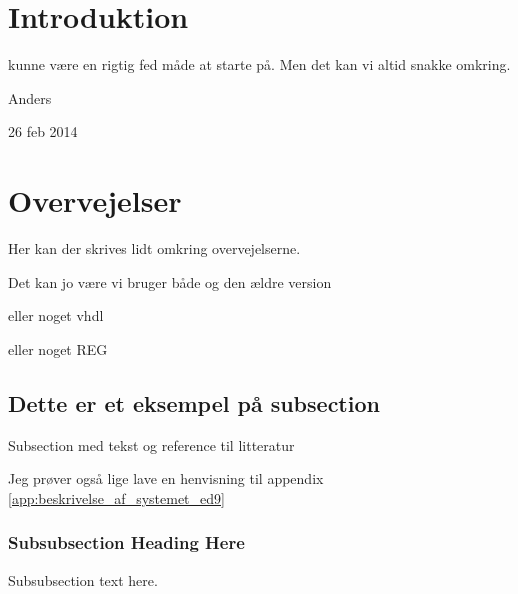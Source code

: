 \section{Introduktion}
\label{sec:introduction}

 kunne være en rigtig fed måde at starte på. Men det kan vi altid snakke omkring.

\hfill Anders
 
\hfill 26 feb 2014


\section{Overvejelser}
Her kan der skrives lidt omkring overvejelserne. 


Det kan jo være vi bruger både\citep{operating_systems_concepts_ed9}
og den ældre version \citep[Side. 223]{operating_systems_concepts_ed8}


eller noget vhdl \citep{pedroni_VHDL}


eller noget REG\citep{reg_modern_control_systems}


\subsection{Dette er et eksempel på subsection}
Subsection med tekst og reference til litteratur

Jeg prøver også lige lave en henvisning til appendix \ref{app:beskrivelse_af_systemet_ed9}

\subsubsection{Subsubsection Heading Here}
Subsubsection text here.

